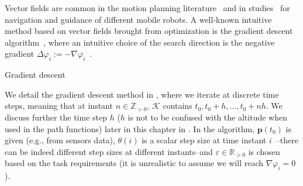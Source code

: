 Vector fields are common in the motion planning literature~\citep{choset2005principles,lavalle2006planning} and in studies~\citep{lindemann2005smoothly,gonccalves2010vector,panagou2014motion,zhou2014vector,kapitanyuk2017guiding,de2017guidance} for navigation and guidance of different mobile robots. A well-known intuitive method based on vector fields brought from optimization is the gradient descent algorithm~\citep{choset2005principles,bryson1975applied}, where an intuitive choice of the search direction is the negative gradient $\Delta \varphi_i:=-\nabla\varphi_i$~\citep{boyd2004convex}.
\begin{algorithm}[h!] %

  \DontPrintSemicolon
  \vspace{.8ex}

  \vspace{1.6ex}

  \caption{Gradient descent}
  \label{algo:grad-desc}
\end{algorithm}
We detail the gradient descent method in , where we iterate at discrete time steps, meaning that at instant $n\in\mathbb{Z}_{>0}$, $\mathcal{K}$ contains $t_0,t_0+h,\dots,t_0+nh$. We discuss further the time step $h$ ($h$ is not to be confused with the altitude when used in the path functions) later in this chapter in . In the algorithm, $\mathbf{p}(t_0)$ is given (e.g., from sensors data), $\theta(i)$ is a scalar step size at time instant $i$~\citep{choset2005principles}--there can be indeed different step sizes at different instants--and $\varepsilon\in\mathbb{R}_{>0}$ is chosen based on the task requirements (it is unrealistic to assume we will reach $\nabla\varphi_i=0$).

